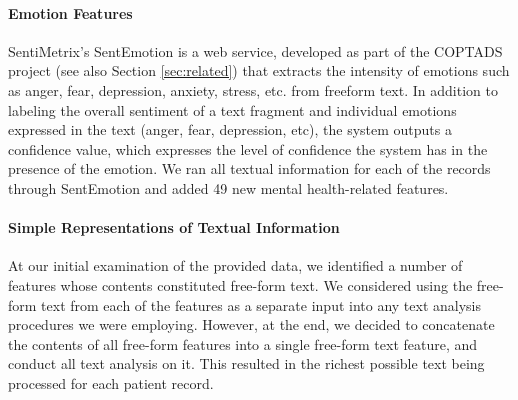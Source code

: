   
 \paragraph{Emotion Features} SentiMetrix's SentEmotion is a web service,
 developed as part of the COPTADS project \cite{coptads,coptads-book} (see also Section \ref{sec:related}) that extracts the intensity of emotions such as anger, fear, depression, anxiety, stress, etc. from freeform text. In addition to labeling the overall sentiment of a text fragment
\cite{subrahmanian2008ava} and individual emotions expressed in the
 text (anger,  fear, depression, etc),  the system outputs a confidence value, which expresses
 the level of confidence the system has in the presence of the emotion.
 We ran all textual information for each of the records through SentEmotion and
 added 49 new mental health-related features.
 
 
\paragraph{Simple Representations of Textual Information}
 At our initial examination of the provided data, we identified a number of features
 whose contents constituted free-form text. We considered using the free-form text from each of the features as a separate input into any text analysis procedures we were employing.
 However, at the end, we decided to concatenate the contents of all free-form features into a single free-form text feature, and conduct all text analysis on it. This resulted in the richest possible text being processed for each patient record. 
 
